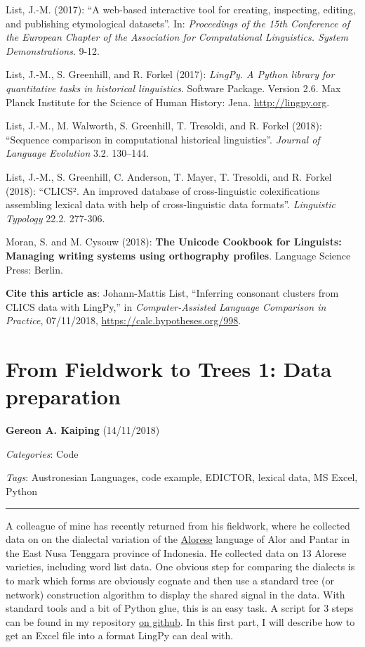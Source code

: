 \documentclass[
  english,
  a4paper,
  oneside,tablecaptionabove
]{scrbook}
\begin{document}
List, J.-M. (2017): ``A web-based interactive tool for
creating, inspecting, editing, and publishing etymological datasets''.
In: \emph{Proceedings of the 15th Conference of the European Chapter
of the Association for Computational Linguistics. System Demonstrations}. 9-12.

List, J.-M., S. Greenhill, and R. Forkel (2017): \emph{LingPy. A
Python library for quantitative tasks in historical linguistics}.
Software Package. Version 2.6. Max Planck Institute for the Science of
Human History: Jena. \href{//lingpy.org”}{http://lingpy.org}.

List, J.-M., M. Walworth, S. Greenhill, T. Tresoldi, and R. Forkel
(2018): ``Sequence comparison in computational historical
linguistics''. \emph{Journal of Language Evolution} 3.2. 130--144.

List, J.-M., S. Greenhill, C. Anderson, T. Mayer, T. Tresoldi, and
R. Forkel (2018): ``CLICS². An improved database of
cross-linguistic colexifications assembling lexical data with help of
cross-linguistic data formats''. \emph{Linguistic Typology} 22.2.
277-306.

Moran, S. and M. Cysouw (2018): \textbf{The Unicode Cookbook for
Linguists: Managing writing systems using orthography profiles}.
Language Science Press: Berlin.

\textbf{Cite this article as}: Johann-Mattis List, ``Inferring consonant
clusters from CLICS data with LingPy,'' in \emph{Computer-Assisted
Language Comparison in Practice}, 07/11/2018,
\url{https://calc.hypotheses.org/998}.

\hypertarget{from-fieldwork-to-trees-1-data-preparation}{%
\chapter{From Fieldwork to Trees 1: Data
preparation}\label{from-fieldwork-to-trees-1-data-preparation}}

\textbf{Gereon A. Kaiping} (14/11/2018)

\emph{Categories}: Code

\emph{Tags}: Austronesian Languages, code example, EDICTOR, lexical
data, MS Excel, Python

\begin{center}\rule{0.5\linewidth}{\linethickness}\end{center}

A colleague of mine has recently returned from his fieldwork, where he
collected data on on the dialectal variation of the
\href{https://glottolog.org/resource/languoid/id/alor1247}{Alorese}
language of Alor and Pantar in the East Nusa Tenggara province of
Indonesia. He collected data on 13 Alorese varieties, including word
list data. One obvious step for comparing the dialects is to mark which
forms are obviously cognate and then use a standard tree (or network)
construction algorithm to display the shared signal in the data. With
standard tools and a bit of Python glue, this is an easy task. A script
for 3 steps can be found in my repository
\href{https://github.com/Anaphory/matrix_to_beastling/tree/master}{on
github}. In this first part, I will describe how to get an Excel file
into a format LingPy can deal with.
\end{document}
